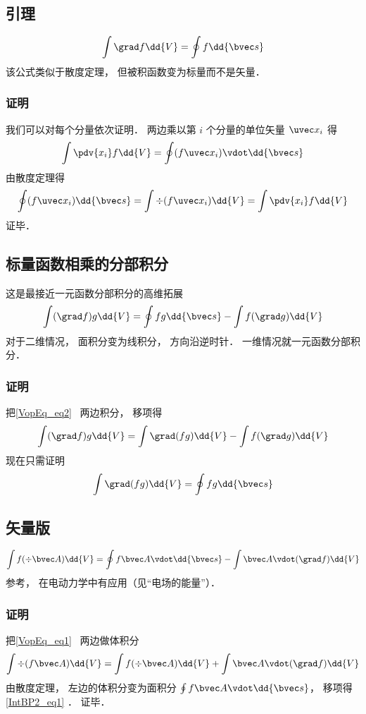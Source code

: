 

\subsection{引理}
\begin{equation}
\int \grad f \dd{V} = \oint f \dd{\bvec s}
\end{equation}
该公式类似于散度定理， 但被积函数变为标量而不是矢量．

\subsubsection{证明}
我们可以对每个分量依次证明． 两边乘以第 $i$ 个分量的单位矢量 $\uvec x_i$ 得
\begin{equation}
\int \pdv{x_i}f \dd{V} = \oint (f\uvec x_i) \vdot \dd{\bvec s}
\end{equation}
由散度定理得
\begin{equation}
\oint (f\uvec x_i) \dd{\bvec s} = \int \div (f\uvec x_i) \dd{V} = \int \pdv{x_i} f \dd{V}
\end{equation}
证毕．

\subsection{标量函数相乘的分部积分}
这是最接近一元函数分部积分的高维拓展
\begin{equation}\label{IntBP2_eq2}
\int (\grad f) g \dd{V} = \oint fg \dd{\bvec s} - \int f (\grad g) \dd{V}
\end{equation}
对于二维情况， 面积分变为线积分， 方向沿逆时针． 一维情况就一元函数分部积分．

\subsubsection{证明}
把\autoref{VopEq_eq2}~ 两边积分， 移项得
\begin{equation}
\int (\grad f) g \dd{V} = \int \grad (fg) \dd{V} - \int f (\grad g) \dd{V}
\end{equation}
现在只需证明
\begin{equation}
\int \grad (fg) \dd{V} = \oint fg \dd{\bvec s}
\end{equation}


\subsection{矢量版}
\begin{equation}\label{IntBP2_eq1}
\int f (\div \bvec A)\dd{V} =  \oint f \bvec A \vdot \dd{\bvec s} - \int\bvec A \vdot (\grad f)\dd{V}
\end{equation}
参考\cite{GriffE}， 在电动力学中有应用（见“电场的能量”）．

\subsubsection{证明}
把\autoref{VopEq_eq1}~ 两边做体积分
\begin{equation}
\int\div (f \bvec A) \dd{V} = \int f (\div \bvec A)\dd{V} + \int\bvec A \vdot (\grad f)\dd{V}
\end{equation}
由散度定理， 左边的体积分变为面积分 $\oint f \bvec A \vdot \dd{\bvec s}$， 移项得\autoref{IntBP2_eq1} ． 证毕．
